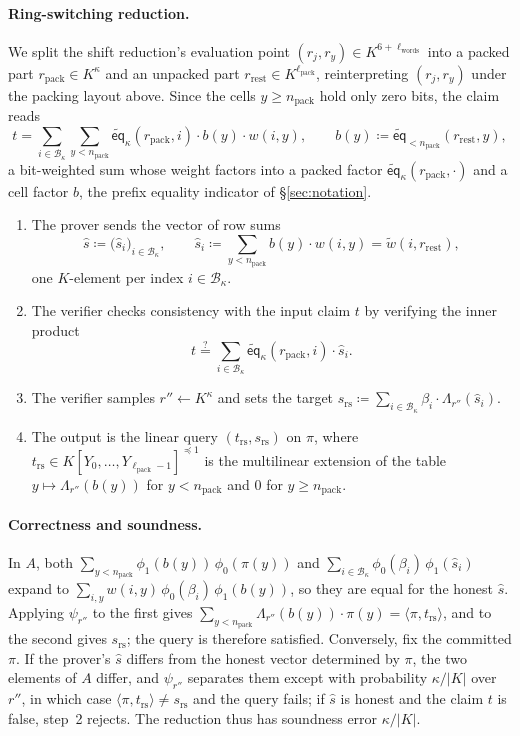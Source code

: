 \documentclass{article}
\theoremstyle{definition}
\newcommand*{\mlin}{{\preceq 1}}
\newcommand*{\mle}{\widetilde}
\newcommand{\eq}{\mathsf{eq}}
\newcommand{\BB}{\mathcal{B}}
\begin{document}
\paragraph{Ring-switching reduction.}
We split the shift reduction's evaluation point $(r_j, r_y) \in K^{6 + \ell_\text{words}}$ into a packed part $r_\text{pack} \in K^\kappa$ and an unpacked part $r_\text{rest} \in K^{\ell_\text{pack}}$, reinterpreting $(r_j, r_y)$ under the packing layout above. Since the cells $y \ge n_\text{pack}$ hold only zero bits, the claim reads
\[
  t = \sum_{i \in \BB_\kappa} \sum_{y < n_\text{pack}} \mle{\eq}_\kappa(r_\text{pack}, i) \cdot b(y) \cdot w(i, y), \qquad b(y) \coloneqq \mle{\eq}_{< n_\text{pack}}(r_\text{rest}, y),
\]
a bit-weighted sum whose weight factors into a packed factor $\mle{\eq}_\kappa(r_\text{pack}, \cdot)$ and a cell factor $b$, the prefix equality indicator of \S\ref{sec:notation}.

\begin{enumerate}
\item The prover sends the vector of row sums
  \[
    \hat{s} \coloneqq \bigl( \hat{s}_i \bigr)_{i \in \BB_\kappa}, \qquad \hat{s}_i \coloneqq \sum_{y < n_\text{pack}} b(y) \cdot w(i, y) = \mle{w}(i, r_\text{rest}),
  \]
  one $K$-element per index $i \in \BB_\kappa$.
\item The verifier checks consistency with the input claim $t$ by verifying the inner product
  \[
    t \stackrel{?}{=} \sum_{i \in \BB_\kappa} \mle{\eq}_\kappa(r_\text{pack}, i) \cdot \hat{s}_i.
  \]
\item The verifier samples $r'' \gets K^\kappa$ and sets the target $s_\text{rs} \coloneqq \sum_{i \in \BB_\kappa} \beta_i \cdot \Lambda_{r''}(\hat{s}_i)$.
\item The output is the linear query $(t_\text{rs}, s_\text{rs})$ on $\pi$, where $t_\text{rs} \in K[Y_0, \ldots, Y_{\ell_\text{pack} - 1}]^\mlin$ is the multilinear extension of the table $y \mapsto \Lambda_{r''}(b(y))$ for $y < n_\text{pack}$ and $0$ for $y \ge n_\text{pack}$.
\end{enumerate}

\paragraph{Correctness and soundness.}
In $A$, both $\sum_{y < n_\text{pack}} \phi_1(b(y))\, \phi_0(\pi(y))$ and $\sum_{i \in \BB_\kappa} \phi_0(\beta_i)\, \phi_1(\hat{s}_i)$ expand to $\sum_{i, y} w(i, y)\, \phi_0(\beta_i)\, \phi_1(b(y))$, so they are equal for the honest $\hat{s}$. Applying $\psi_{r''}$ to the first gives $\sum_{y < n_\text{pack}} \Lambda_{r''}(b(y)) \cdot \pi(y) = \langle \pi, t_\text{rs} \rangle$, and to the second gives $s_\text{rs}$; the query is therefore satisfied. Conversely, fix the committed $\pi$. If the prover's $\hat{s}$ differs from the honest vector determined by $\pi$, the two elements of $A$ differ, and $\psi_{r''}$ separates them except with probability $\kappa / |K|$ over $r''$, in which case $\langle \pi, t_\text{rs} \rangle \ne s_\text{rs}$ and the query fails; if $\hat{s}$ is honest and the claim $t$ is false, step~2 rejects. The reduction thus has soundness error $\kappa / |K|$.
\end{document}
